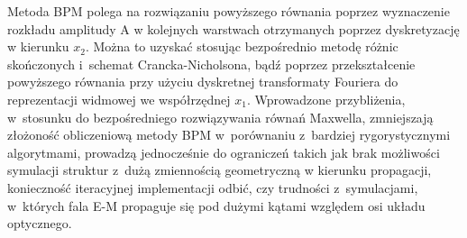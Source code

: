 Metoda BPM polega na rozwiązaniu powyższego równania poprzez wyznaczenie rozkładu amplitudy A w kolejnych warstwach otrzymanych poprzez dyskretyzację w kierunku $x_2$. Można to uzyskać stosując bezpośrednio metodę różnic skończonych i~schemat Crancka-Nicholsona, bądź poprzez przekształcenie powyższego równania przy użyciu dyskretnej transformaty Fouriera do reprezentacji widmowej we współrzędnej $x_1$. Wprowadzone przybliżenia, w~stosunku do bezpośredniego rozwiązywania równań Maxwella, zmniejszają złożoność obliczeniową metody BPM w~porównaniu z~bardziej rygorystycznymi algorytmami, prowadzą jednocześnie do ograniczeń takich jak brak możliwości symulacji struktur z~dużą zmiennością geometryczną w kierunku propagacji, konieczność iteracyjnej implementacji odbić, czy trudności z~symulacjami, w~których fala E-M propaguje się pod dużymi kątami względem osi układu optycznego.



 
